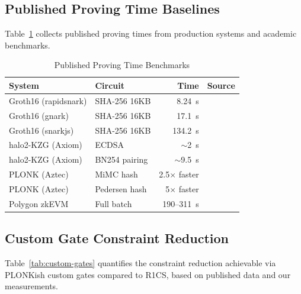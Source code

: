 \subsection{Published Proving Time Baselines}

Table~\ref{tab:published-proving} collects published proving times
from production systems and academic benchmarks.

\begin{table}[htbp]
\caption{Published Proving Time Benchmarks}
\label{tab:published-proving}
\centering
\begin{tabular}{@{}llrl@{}}
\toprule
\textbf{System} & \textbf{Circuit} & \textbf{Time} & \textbf{Source} \\
\midrule
Groth16 (rapidsnark) & SHA-256 16KB & 8.24~s & \cite{zkbench} \\
Groth16 (gnark) & SHA-256 16KB & 17.1~s & \cite{zkbench} \\
Groth16 (snarkjs) & SHA-256 16KB & 134.2~s & \cite{zkbench} \\
halo2-KZG (Axiom) & ECDSA & $\sim$2~s & \cite{axiom} \\
halo2-KZG (Axiom) & BN254 pairing & $\sim$9.5~s & \cite{axiom} \\
PLONK (Aztec) & MiMC hash & 2.5$\times$ faster & \cite{aztec-bench} \\
PLONK (Aztec) & Pedersen hash & 5$\times$ faster & \cite{aztec-bench} \\
Polygon zkEVM & Full batch & 190--311~s & \cite{polygon-zkevm} \\
\bottomrule
\end{tabular}
\end{table}

\subsection{Custom Gate Constraint Reduction}

Table~\ref{tab:custom-gates} quantifies the constraint reduction
achievable via PLONKish custom gates compared to R1CS, based on
published data and our measurements.

